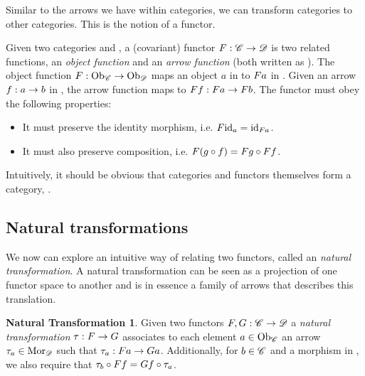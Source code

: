 Similar to the arrows we have within categories, we can transform categories to other categories. This is the notion of a functor.
\begin{covfunctordef}
  Given two categories  and , a (covariant) functor $\mathnormal{F}: \mathscr{C} \to \mathscr{D}$ is two related functions, an \emph{object function} and an \emph{arrow function} (both written as ). The object function $\mathnormal{F}: \mathrm{Ob}_{\mathscr{C}} \to \mathrm{Ob}_{\mathscr{D}}$ maps an object $a$ in  to $\mathnormal{F} \mathnormal{a}$ in . Given an arrow $\mathnormal{f}: \mathnormal{a} \to \mathnormal{b}$ in , the arrow function maps  to $\mathnormal{F} \mathnormal{f}: \mathnormal{F} \mathnormal{a} \to \mathnormal{F} \mathnormal{b}$. The functor must obey the following properties: 
  \begin{itemize}
    \item It must preserve the identity morphism, i.e. $\mathnormal{F} \mathnormal{\mathrm{id}_{\mathnormal{a}}} = \mathrm{id}_{\mathnormal{\mathnormal{F} \mathnormal{a}}}$.
    \item It must also preserve composition, i.e. $\mathnormal{F} \mathnormal{\left(\mathnormal{g} \circ \mathnormal{f}\right)} = \mathnormal{F} \mathnormal{\mathnormal{g}} \circ \mathnormal{F} \mathnormal{\mathnormal{f}}$.
  \end{itemize}
\end{covfunctordef}

Intuitively, it should be obvious that categories and functors themselves form a category, .\\

\subsection{Natural transformations}
\theoremstyle{definition}\newtheorem*{nattransdef}{Natural Transformation}
We now can explore an intuitive way of relating two functors, called an \emph{natural transformation}. A natural transformation can be seen as a projection of one functor space to another and is in essence a family of arrows that describes this translation.
\begin{nattransdef}
Given two functors $\mathnormal{F}, \mathnormal{G} : \mathscr{C} \to \mathscr{D}$ a \emph{natural transformation} $\tau: \mathnormal{F} \to \mathnormal{G}$ associates to each element $\mathnormal{a} \in \mathrm{Ob}_{\mathscr{C}}$ an arrow $\tau_{a} \in \mathrm{Mor}_{\mathscr{D}}$ such that $\tau_{a}: \mathnormal{F} \mathnormal{a} \to \mathnormal{G} \mathnormal{a}$. Additionally, for $\mathnormal{b} \in \mathscr{C}$ and  a morphism in , we also require that $\tau_{b} \circ \mathnormal{F} \mathnormal{f} = \mathnormal{G} \mathnormal{f} \circ \tau_{a}$.

\end{nattransdef}
